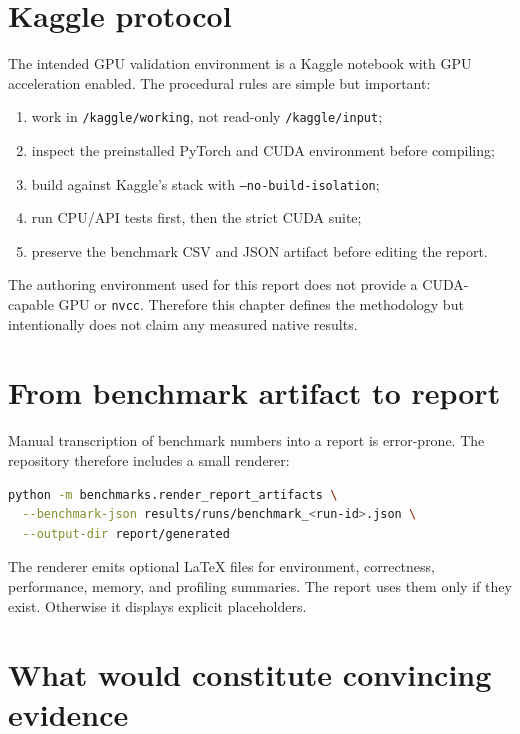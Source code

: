 \section{Kaggle protocol}

The intended GPU validation environment is a Kaggle notebook with GPU acceleration enabled. The procedural rules are simple but important:
\begin{enumerate}
  \item work in \texttt{/kaggle/working}, not read-only \texttt{/kaggle/input};
  \item inspect the preinstalled PyTorch and CUDA environment before compiling;
  \item build against Kaggle's stack with \texttt{--no-build-isolation};
  \item run CPU/API tests first, then the strict CUDA suite;
  \item preserve the benchmark CSV and JSON artifact before editing the report.
\end{enumerate}

\begin{reprobox}
The authoring environment used for this report does not provide a CUDA-capable GPU or \texttt{nvcc}. Therefore this chapter defines the methodology but intentionally does not claim any measured native results.
\end{reprobox}

\section{From benchmark artifact to report}

Manual transcription of benchmark numbers into a report is error-prone. The repository therefore includes a small renderer:
\begin{lstlisting}[language=bash,caption={Generating report snippets from one benchmark JSON artifact.}]
python -m benchmarks.render_report_artifacts \
  --benchmark-json results/runs/benchmark_<run-id>.json \
  --output-dir report/generated
\end{lstlisting}
The renderer emits optional LaTeX files for environment, correctness, performance, memory, and profiling summaries. The report uses them only if they exist. Otherwise it displays explicit placeholders.

\section{What would constitute convincing evidence}

